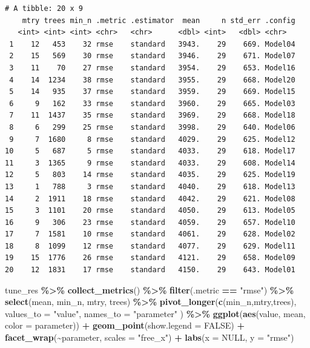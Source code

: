 \documentclass[
]{article}
\newenvironment{Shaded}{\begin{snugshade}}{\end{snugshade}}
\newcommand{\DataTypeTok}[1]{\textcolor[rgb]{0.13,0.29,0.53}{#1}}
\newcommand{\KeywordTok}[1]{\textcolor[rgb]{0.13,0.29,0.53}{\textbf{#1}}}
\newcommand{\NormalTok}[1]{#1}
\newcommand{\OperatorTok}[1]{\textcolor[rgb]{0.81,0.36,0.00}{\textbf{#1}}}
\newcommand{\OtherTok}[1]{\textcolor[rgb]{0.56,0.35,0.01}{#1}}
\newcommand{\StringTok}[1]{\textcolor[rgb]{0.31,0.60,0.02}{#1}}
\begin{document}
\begin{verbatim}
# A tibble: 20 x 9
    mtry trees min_n .metric .estimator  mean     n std_err .config
   <int> <int> <int> <chr>   <chr>      <dbl> <int>   <dbl> <chr>  
 1    12   453    32 rmse    standard   3943.    29    669. Model04
 2    15   569    30 rmse    standard   3946.    29    671. Model07
 3    11    70    27 rmse    standard   3954.    29    653. Model16
 4    14  1234    38 rmse    standard   3955.    29    668. Model20
 5    14   935    37 rmse    standard   3959.    29    669. Model15
 6     9   162    33 rmse    standard   3960.    29    665. Model03
 7    11  1437    35 rmse    standard   3969.    29    668. Model18
 8     6   299    25 rmse    standard   3998.    29    640. Model06
 9     7  1680     8 rmse    standard   4029.    29    625. Model12
10     5   687     5 rmse    standard   4033.    29    618. Model17
11     3  1365     9 rmse    standard   4033.    29    608. Model14
12     5   803    14 rmse    standard   4035.    29    625. Model19
13     1   788     3 rmse    standard   4040.    29    618. Model13
14     2  1911    18 rmse    standard   4042.    29    621. Model08
15     3  1101    20 rmse    standard   4050.    29    613. Model05
16     9   306    23 rmse    standard   4059.    29    657. Model10
17     7  1581    10 rmse    standard   4061.    29    628. Model02
18     8  1099    12 rmse    standard   4077.    29    629. Model11
19    15  1776    26 rmse    standard   4121.    29    658. Model09
20    12  1831    17 rmse    standard   4150.    29    643. Model01
\end{verbatim}

\begin{Shaded}
\begin{Highlighting}[]
\NormalTok{tune\_res }\OperatorTok{\%>\%}
\StringTok{  }\KeywordTok{collect\_metrics}\NormalTok{() }\OperatorTok{\%>\%}
\StringTok{  }\KeywordTok{filter}\NormalTok{(.metric }\OperatorTok{==}\StringTok{ "rmse"}\NormalTok{) }\OperatorTok{\%>\%}
\StringTok{  }\KeywordTok{select}\NormalTok{(mean, min\_n, mtry, trees) }\OperatorTok{\%>\%}
\StringTok{  }\KeywordTok{pivot\_longer}\NormalTok{(}\KeywordTok{c}\NormalTok{(min\_n,mtry,trees),}
    \DataTypeTok{values\_to =} \StringTok{"value"}\NormalTok{,}
    \DataTypeTok{names\_to =} \StringTok{"parameter"}
\NormalTok{  ) }\OperatorTok{\%>\%}
\StringTok{  }\KeywordTok{ggplot}\NormalTok{(}\KeywordTok{aes}\NormalTok{(value, mean, }\DataTypeTok{color =}\NormalTok{ parameter)) }\OperatorTok{+}
\StringTok{  }\KeywordTok{geom\_point}\NormalTok{(}\DataTypeTok{show.legend =} \OtherTok{FALSE}\NormalTok{) }\OperatorTok{+}
\StringTok{  }\KeywordTok{facet\_wrap}\NormalTok{(}\OperatorTok{\textasciitilde{}}\NormalTok{parameter, }\DataTypeTok{scales =} \StringTok{"free\_x"}\NormalTok{) }\OperatorTok{+}
\StringTok{  }\KeywordTok{labs}\NormalTok{(}\DataTypeTok{x =} \OtherTok{NULL}\NormalTok{, }\DataTypeTok{y =} \StringTok{"rmse"}\NormalTok{)}
\end{Highlighting}
\end{Shaded}
\end{document}
